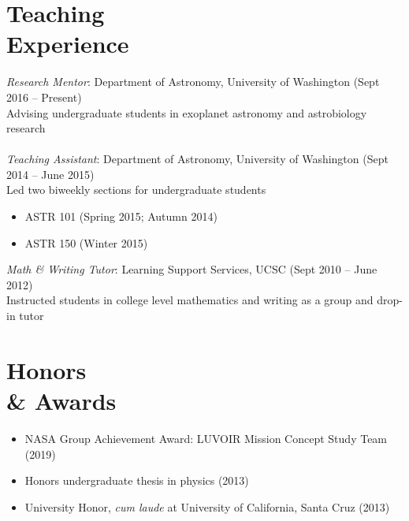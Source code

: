 \documentclass[margin,10pt]{res}
\begin{document}
\begin{resume}
\section{Teaching \\Experience} 
                {\sl Research Mentor}: Department of Astronomy, University of Washington \hfill (Sept 2016 -- Present)\\
                Advising undergraduate students in exoplanet astronomy and astrobiology research\\
                \\
                {\sl Teaching Assistant}: Department of Astronomy, University of Washington   \hfill          (Sept 2014 -- June 2015)\\
                Led two biweekly sections for undergraduate students
                    \begin{itemize}  \itemsep -1pt %
                        \item ASTR 101 (Spring 2015; Autumn 2014)
                        \item ASTR 150 (Winter 2015)
                    \end{itemize}  
                
                {\sl Math \& Writing Tutor}: Learning Support Services, UCSC   \hfill          (Sept 2010 -- June 2012)\\
                Instructed students in college level mathematics and writing as a group and drop-in tutor\\
                 
                                  
\section{Honors \\ \& Awards}
                 \begin{itemize}  \itemsep -1pt %
                    \item NASA Group Achievement Award: LUVOIR Mission Concept Study Team (2019)
                    \item Honors undergraduate thesis in physics (2013)
                    \item University Honor, \textit{cum laude} at University of California, Santa Cruz (2013)\\
                 \end{itemize}  
                 

\end{resume}
\end{document}

